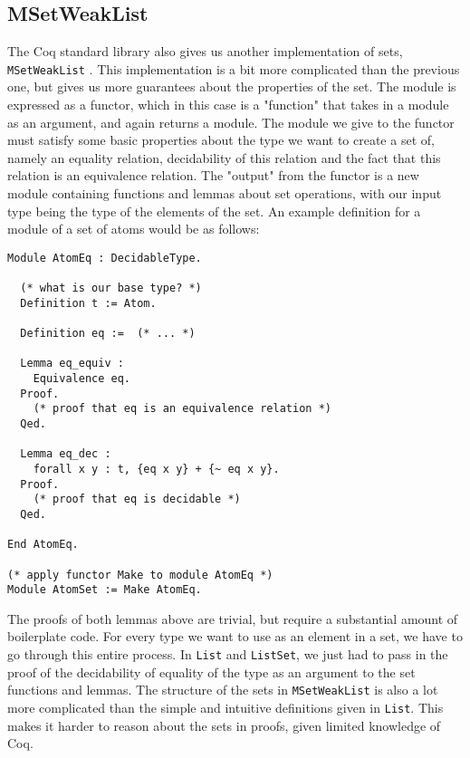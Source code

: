 \subsection{MSetWeakList}
\label{ssec:msetweaklist}

The Coq standard library also gives us another implementation of sets, \lstinline{MSetWeakList} \cite{coqmsetweaklist}.
This implementation is a bit more complicated than the previous one,
but gives us more guarantees about the properties of the set.
The module is expressed as a functor, which in this case is a "function" that takes in a module as an argument, and again returns a module.
The module we give to the functor must satisfy some basic properties about the type we want to create a set of,
namely an equality relation, decidability of this relation and the fact that this relation is an equivalence relation.
The "output" from the functor is a new module containing functions and lemmas about set operations,
with our input type being the type of the elements of the set.
An example definition for a module of a set of atoms would be as follows:

\begin{minipage}{\linewidth}
\begin{lstlisting}[language=Coq, label={lst:msetweaklist_ex1}, caption={Set of atoms in \lstinline{MSetWeakList} module}]
Module AtomEq : DecidableType.

  (* what is our base type? *)
  Definition t := Atom.

  Definition eq :=  (* ... *)

  Lemma eq_equiv :
    Equivalence eq.
  Proof.
    (* proof that eq is an equivalence relation *)
  Qed.

  Lemma eq_dec :
    forall x y : t, {eq x y} + {~ eq x y}.
  Proof.
    (* proof that eq is decidable *)
  Qed.

End AtomEq.

(* apply functor Make to module AtomEq *)
Module AtomSet := Make AtomEq.
\end{lstlisting}
\end{minipage}

The proofs of both lemmas above are trivial, but require a substantial amount of boilerplate code.
For every type we want to use as an element in a set, we have to go through this entire process.
In \lstinline{List} and \lstinline{ListSet}, we just had to pass in the proof of the decidability of equality of the type as an argument to the set functions and lemmas.
The structure of the sets in \lstinline{MSetWeakList} is also a lot more complicated than
the simple and intuitive definitions given in \lstinline{List}.
This makes it harder to reason about the sets in proofs, given limited knowledge of Coq.

